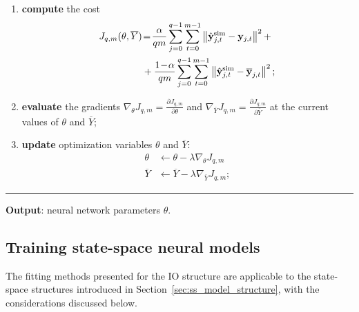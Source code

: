 \documentclass{article}
\renewcommand{\theenumi}{\arabic{enumi}}
\renewcommand{\theenumii}{\arabic{enumii}}
\newcommand{\batchsize}{q}
\newcommand{\seqlen}{m}
\newcommand{\numiter}{n}
\newcommand{\tens}[1]{\mathbf{#1}}
\newcommand{\hidden}[1]{\overline{#1}}
\newcommand{\norm}[1]{\left\lVert#1\right\rVert}
\begin{document}
\begin{algorithm}
\begin{enumerate}[label=\arabic*., ref=\theenumi{}]
\begin{enumerate}[label=\theenumi{}.\arabic*., ref=\theenumi{}.\theenumii{}]
			\item \textbf{compute} the cost 
			\begin{equation}
			\begin{split}
			\label{eq:batch_cost}
			J_{\batchsize,\seqlen}(\theta,\hidden{Y})&\!=\!\frac{\alpha}{\batchsize \seqlen}\sum_{j=0}^{\batchsize-1}\sum_{t=0}^{\seqlen-1} \norm{\hat{\tens{y}}^{\rm sim}_{j,t} - {{\tens{y}}}_{j,t}}^2  + \\
			        &+\frac{1\!-\!\alpha}{\batchsize \seqlen} \sum_{j=0}^{\batchsize-1}\sum_{t=0}^{\seqlen-1}  \norm{\hat{\tens{y}}^{\rm sim}_{j,t} - \hidden{{\tens{y}}}_{j,t}}^2;
			\end{split}
			\end{equation}



\item \textbf{evaluate} the gradients $\nabla_\theta J_{\batchsize,\seqlen}=\frac{\partial J_{\batchsize,\seqlen}}{\partial \theta}$ and  
			$\nabla_{\hidden{Y}} J_{\batchsize,\seqlen}=\frac{\partial J_{\batchsize,\seqlen}}{\partial \hidden{Y}}$ at the current values of $\theta$ and $\hidden{Y}$;
			\item  \textbf{update} optimization variables $\theta$ and $\hidden{Y}$:
			\begin{equation}
			\label{eq:SGD}
			\begin{split}
			 \theta &\leftarrow \theta - \lambda \nabla_\theta J_{\batchsize,\seqlen}  \\
			 \hidden{Y} & \leftarrow \hidden{Y} - \lambda \nabla_{\hidden{Y}} J_{\batchsize,\seqlen};
			\end{split}
			\end{equation}
		\end{enumerate}
	\end{enumerate}
	\vspace*{-.0cm}\hrule\vspace*{.1cm}
	\textbf{Output}:  neural network parameters $\theta$. 
\end{algorithm} 

\subsection{Training state-space neural models}
\label{sec:training_ss}
The fitting methods presented for the IO structure are applicable to the state-space structures introduced in Section~\ref{sec:ss_model_structure}, with the considerations   discussed below. 
\end{document}
